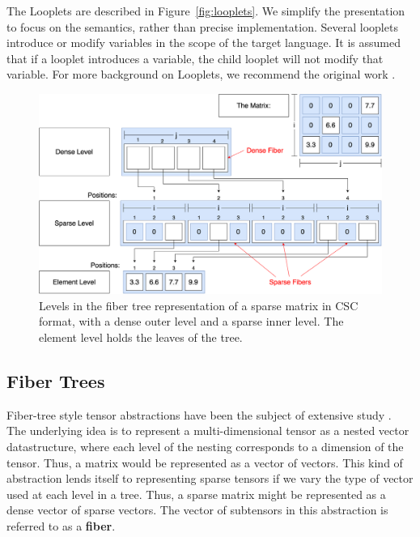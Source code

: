 The Looplets are described in Figure~\ref{fig:looplets}. We simplify the presentation to focus on the semantics, rather than precise implementation. Several looplets introduce or modify variables in the scope of the target language. It is assumed that if a looplet introduces a variable, the child looplet will not modify that variable. For more background on Looplets, we recommend the original work \cite{ahrens_looplets_2023}. 

\begin{figure}
    \centering
    \vspace{-28pt}
    \includegraphics[width=\linewidth]{LevelsVsFibers-matrix.png}
    \vspace{-16pt}
    \caption{Levels in the fiber tree representation of a sparse matrix in CSC format, with a dense outer level and a sparse inner level. The element level holds the leaves of the tree.}
    \label{fig:levelsvsfibers}
    \vspace{-24pt}
\end{figure}
\subsection{Fiber Trees}

Fiber-tree style tensor abstractions have been the subject of extensive study
\cite{sze_efficient_2017,chou_compilation_2022,chou_format_2018}.  The underlying
idea is to represent a multi-dimensional tensor as a nested vector
datastructure, where each level of the nesting corresponds to a dimension of the
tensor. Thus, a matrix would be represented as a vector of vectors. This kind of
abstraction lends itself to representing sparse tensors if we vary the type of
vector used at each level in a tree. Thus, a sparse matrix might be represented
as a dense vector of sparse vectors. The vector of subtensors in this
abstraction is referred to as a \textbf{fiber}.

